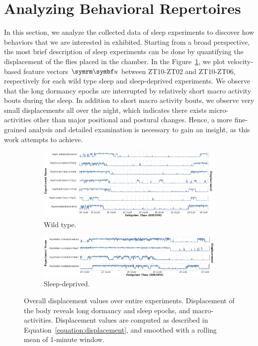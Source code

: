 \section{Analyzing Behavioral Repertoires}\label{section:analyzing-behavioral-repertoires}
In this section, we analyze the collected data of sleep experiments to discover how behaviors that we are interested in exhibited.
Starting from a broad perspective, the most brief description of sleep experiments can be done by quantifying the displacement of the flies placed in the chamber.
In the Figure~\ref{figure:displacement}, we plot velocity-based feature vectors $\V{u}$ between ZT10-ZT02 and ZT10-ZT06, respectively for each wild type sleep and sleep-deprived experiments.
We observe that the long dormancy epochs are interrupted by relatively short macro activity bouts during the sleep.
In addition to short macro activity bouts, we observe very small displacements all over the night, which indicates there exists micro-activities other than major positional and postural changes.
Hence, a more fine-grained analysis and detailed examination is necessary to gain an insight, as this work attempts to achieve.

\begin{figure}[t!]
	\centering
	\begin{subfigure}[b]{0.95\linewidth}
		\centering\includegraphics[width=\linewidth]{figures/Velocity-WT-1T.pdf}
		\caption{Wild type.}
	\end{subfigure}%

	\begin{subfigure}[b]{0.95\linewidth}
		\centering\includegraphics[width=\linewidth]{figures/Velocity-SD-1T.pdf}
		\caption{Sleep-deprived.}
	\end{subfigure}%
	\caption[Overall displacement values over entire experiments.]{Overall displacement values over entire experiments.
		Displacement of the body reveals long dormancy and sleep epochs, and macro-activities.
		Displacement values are computed as described in Equation~\ref{equation:displacement}, and smoothed with a rolling mean of 1-minute window.\label{figure:displacement}}
\end{figure}

